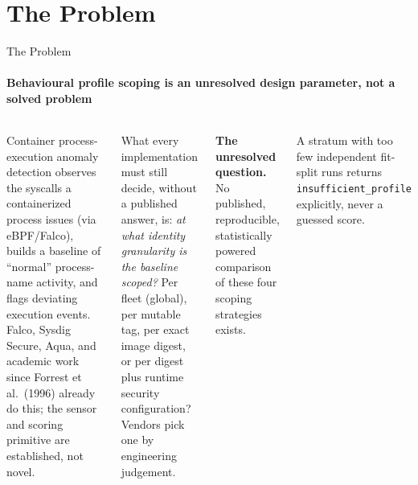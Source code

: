 \documentclass[aspectratio=169, 11pt]{beamer}
\begin{document}
\section{The Problem}
\begin{frame}{The Problem}
\framesubtitle{Behavioural profile scoping is an unresolved design parameter, not a solved problem}

\begin{columns}[T]
\small
Container process-execution anomaly detection observes the syscalls a
containerized process issues (via eBPF/Falco), builds a baseline of
``normal'' process-name activity, and flags deviating execution events.
Falco, Sysdig Secure, Aqua, and academic work since Forrest et al.\ (1996)
already do this; the sensor and scoring primitive are established, not novel.

\medskip
What every implementation must still decide, without a published answer, is:
\emph{at what identity granularity is the baseline scoped?} Per fleet
(global), per mutable tag, per exact image digest, or per digest plus
runtime security configuration? Vendors pick one by engineering judgement.

\medskip
\textbf{The unresolved question.} No published, reproducible, statistically
powered comparison of these four scoping strategies exists.

\centering
{}

\smallskip
{\scriptsize A stratum with too few independent fit-split runs returns
\texttt{insufficient\_profile} explicitly, never a guessed score.}
\end{columns}
\end{frame}
\end{document}
